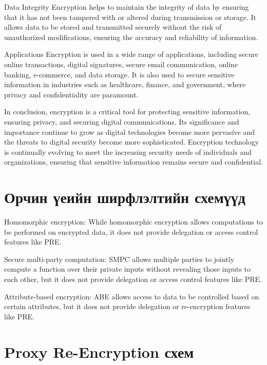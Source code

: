 Data Integrity
Encryption helps to maintain the integrity of data by ensuring that it has not been tampered with or altered during transmission or storage. It allows data to be stored and transmitted securely without the risk of unauthorized modifications, ensuring the accuracy and reliability of information.

Applications
Encryption is used in a wide range of applications, including secure online transactions, digital signatures, secure email communication, online banking, e-commerce, and data storage. It is also used to secure sensitive information in industries such as healthcare, finance, and government, where privacy and confidentiality are paramount.

In conclusion, encryption is a critical tool for protecting sensitive information, ensuring privacy, and securing digital communications. Its significance and importance continue to grow as digital technologies become more pervasive and the threats to digital security become more sophisticated. Encryption technology is continually evolving to meet the increasing security needs of individuals and organizations, ensuring that sensitive information remains secure and confidential.

\section{Орчин үеийн ширфлэлтийн схемүүд}
Homomorphic encryption: While homomorphic encryption allows computations to be performed on encrypted data, it does not provide delegation or access control features like PRE.

Secure multi-party computation: SMPC allows multiple parties to jointly compute a function over their private inputs without revealing those inputs to each other, but it does not provide delegation or access control features like PRE.

Attribute-based encryption: ABE allows access to data to be controlled based on certain attributes, but it does not provide delegation or re-encryption features like PRE.

\section{Proxy Re-Encryption схем}

